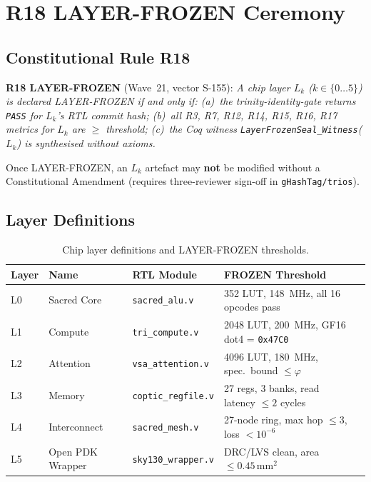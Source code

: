 
\section{R18 LAYER-FROZEN Ceremony}
\label{sec:flos74-frozen}

\subsection{Constitutional Rule R18}

\textbf{R18 LAYER-FROZEN} (Wave~21, vector S-155):
\emph{A chip layer \(L_k\) (\(k \in \{0\ldots5\}\)) is declared LAYER-FROZEN
if and only if: (a)~the trinity-identity-gate returns \texttt{PASS} for
\(L_k\)'s RTL commit hash; (b)~all R3, R7, R12, R14, R15, R16, R17 metrics
for \(L_k\) are \(\ge\) threshold; (c)~the Coq witness
\texttt{LayerFrozenSeal\_Witness}(\(L_k\)) is synthesised without axioms.}

Once LAYER-FROZEN, an \(L_k\) artefact may \textbf{not} be modified without a
Constitutional Amendment (requires three-reviewer sign-off in
\texttt{gHashTag/trios}).

\subsection{Layer Definitions}

\begin{table}[h]
\centering
\caption{Chip layer definitions and LAYER-FROZEN thresholds.}
\label{tab:layers}
\begin{tabular}{lllll}
\hline
Layer & Name & RTL Module & FROZEN Threshold \\
\hline
L0 & Sacred Core & \texttt{sacred\_alu.v} & 352 LUT, 148~MHz, all 16 opcodes pass \\
L1 & Compute & \texttt{tri\_compute.v} & 2048 LUT, 200~MHz, GF16 dot4 = \texttt{0x47C0} \\
L2 & Attention & \texttt{vsa\_attention.v} & 4096 LUT, 180~MHz, spec.\ bound \(\le\varphi\) \\
L3 & Memory & \texttt{coptic\_regfile.v} & 27 regs, 3 banks, read latency \(\le 2\) cycles \\
L4 & Interconnect & \texttt{sacred\_mesh.v} & 27-node ring, max hop \(\le 3\), loss \(<10^{-6}\) \\
L5 & Open PDK Wrapper & \texttt{sky130\_wrapper.v} & DRC/LVS clean, area \(\le 0.45\,\text{mm}^2\) \\
\hline
\end{tabular}
\end{table}


